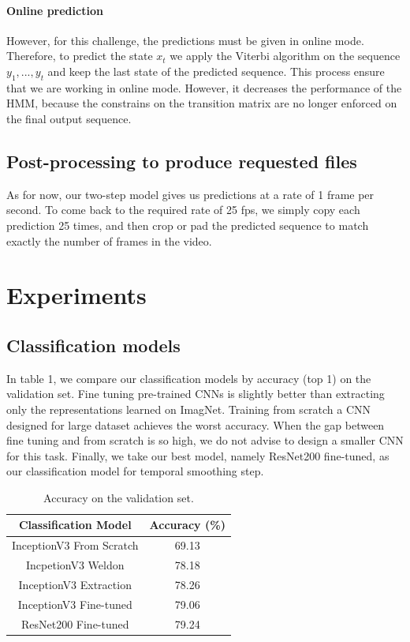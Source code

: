 \documentclass[10pt,twocolumn,letterpaper]{article}
\begin{document}
\paragraph{Online prediction} However, for this challenge, the predictions must
be given in online mode. Therefore, to predict the state
$x_t$ we apply the Viterbi algorithm on the sequence $y_1,...,y_t$ and keep the
last state of the predicted sequence. This process ensure that we are working in online
mode. However, it decreases the performance of the HMM, because the constrains on the transition
matrix are no longer enforced on the final output sequence.

\subsection{Post-processing to produce requested files}

As for now, our two-step model gives us predictions at a rate of 1 frame per second. To come
back to the required rate of 25 fps, we simply copy each prediction 25 times, and
then crop or pad the predicted sequence to match exactly the number of frames in
the video.

\section{Experiments}

\subsection{Classification models}

In table 1, we compare our classification models by accuracy (top 1) on the validation set. Fine tuning pre-trained CNNs is slightly better than extracting only the representations learned on ImagNet. Training from scratch a CNN designed for large dataset achieves the worst accuracy. When the gap between fine tuning and from scratch is so high, we do not advise to design a smaller CNN for this task. Finally, we take our best model, namely ResNet200 fine-tuned, as our classification model for temporal smoothing step.

\begin{table}
	\begin{center}
		\begin{tabular}{|c|c|}
			\hline
			Classification Model & Accuracy (\%) \\
			\hline\hline
			InceptionV3 From Scratch & 69.13 \\
			IncpetionV3 Weldon & 78.18 \\
			InceptionV3 Extraction & 78.26 \\
			InceptionV3 Fine-tuned & 79.06 \\
			ResNet200 Fine-tuned & 79.24 \\
			\hline
		\end{tabular}
	\end{center}
	\caption{Accuracy on the validation set.}
\end{table}
\end{document}
